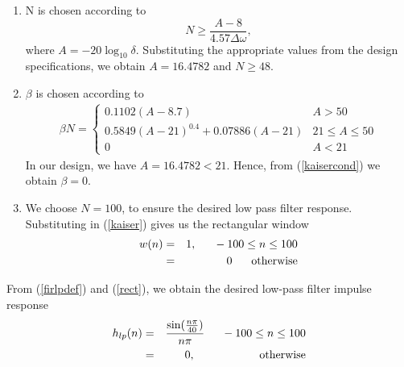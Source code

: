 \documentclass{article}
\begin{document}
\begin{enumerate}
\item  N is chosen according to
\begin{equation}
N \geq \frac{A-8}{4.57\Delta \omega},
\end{equation}
where $A = -20\log_{10}\delta$.  Substituting the appropriate values from the design specifications, we obtain
$A = 16.4782$ and $N \geq 48$.

\item  $\beta$ is chosen according to
\begin{eqnarray}
\label{kaisercond}
\beta N = \left\{ \begin{array}{ll} 0.1102(A-8.7) & A > 50 \\
0.5849(A-21)^{0.4}+ 0.07886(A-21) & 21 \leq A \leq 50 \\
0 & A < 21\end{array} \right.
\end{eqnarray}
In our design, we have $A = 16.4782 < 21$.  Hence, from (\ref{kaisercond}) we obtain $\beta = 0$.  

\item We choose $N = 100$, to ensure the desired low pass filter response.  Substituting in (\ref{kaiser})
gives us the rectangular window
\begin{eqnarray}
\label{rect}
w(n) &=& 1, \indent -100 \leq n \leq 100 \nonumber \\
&=& 0 \hspace{6mm} \mbox{otherwise}
\end{eqnarray}
\end{enumerate}

From (\ref{firlpdef}) and (\ref{rect}), we obtain the desired low-pass filter impulse response
\begin{eqnarray}
\label{firlpfinal}
h_{lp}(n) &=& \frac{\sin(\frac{n\pi}{40})}{n\pi} \indent -100 \leq n \leq 100 \nonumber \\
&=& 0, \hspace{2cm} \mbox{otherwise}
\end{eqnarray}
\end{document}
